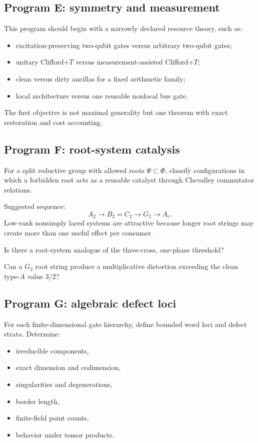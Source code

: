 \subsection{Program E: symmetry and measurement}
This program should begin with a narrowly declared resource theory, such as:
\begin{itemize}
\item excitation-preserving two-qubit gates versus arbitrary two-qubit gates;
\item unitary Clifford+$T$ versus measurement-assisted Clifford+$T$;
\item clean versus dirty ancillas for a fixed arithmetic family;
\item local architecture versus one reusable nonlocal bus gate.
\end{itemize}
The first objective is not maximal generality but one theorem with exact restoration and cost accounting.

\subsection{Program F: root-system catalysis}
For a split reductive group with allowed roots $\Psi\subset\Phi$, classify configurations in which a forbidden root acts as a reusable catalyst through Chevalley commutator relations.

Suggested sequence:
\[
A_2\to B_2=C_2\to G_2\to A_r.
\]
Low-rank nonsimply laced systems are attractive because longer root strings may create more than one useful effect per consumer.

\begin{question}
Is there a root-system analogue of the three-cross, one-phase threshold?
\end{question}
\begin{question}
Can a $G_2$ root string produce a multiplicative distortion exceeding the clean type-$A$ value $3/2$?
\end{question}

\subsection{Program G: algebraic defect loci}
For each finite-dimensional gate hierarchy, define bounded word loci and defect strata.  Determine:
\begin{itemize}
\item irreducible components,
\item exact dimension and codimension,
\item singularities and degenerations,
\item border length,
\item finite-field point counts,
\item behavior under tensor products.
\end{itemize}

